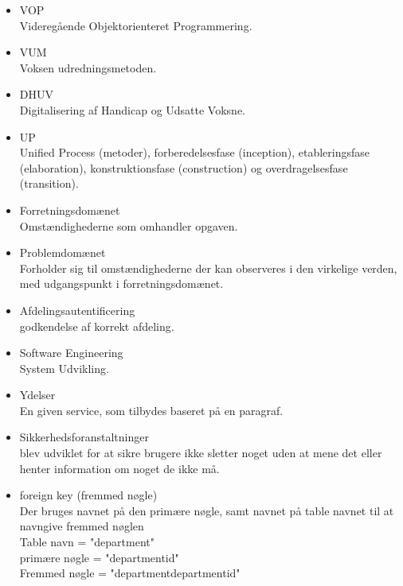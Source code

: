 \begin{itemize}
\renewcommand\labelitemi{--}
\item VOP \\
Videregående Objektorienteret Programmering.
\item VUM \\
Voksen udredningsmetoden.
\item DHUV \\
Digitalisering af Handicap og Udsatte Voksne.
\item UP \\
Unified Process (metoder), forberedelsesfase (inception), etableringsfase (elaboration), konstruktionsfase (construction) og overdragelsesfase (transition).
\item Forretningsdomænet\\
Omstændighederne som omhandler opgaven.
\item Problemdomænet \\
Forholder sig til omstændighederne der kan observeres i den virkelige verden, med udgangspunkt i forretningsdomænet.
\item Afdelingsautentificering \\
godkendelse af korrekt afdeling.
\item Software Engineering \\
System Udvikling.
\item Ydelser \\
En given service, som tilbydes baseret på en paragraf.
\item Sikkerhedsforanstaltninger\\
blev udviklet for at sikre brugere ikke sletter noget uden at mene det eller henter information om noget de ikke må.
\item foreign key (fremmed nøgle) \\
Der bruges navnet på den primære nøgle, samt navnet på table navnet til at navngive fremmed nøglen\\
Table navn = "department" \\
primære nøgle = "departmentid" \\
Fremmed nøgle = "departmentdepartmentid"
\end{itemize}